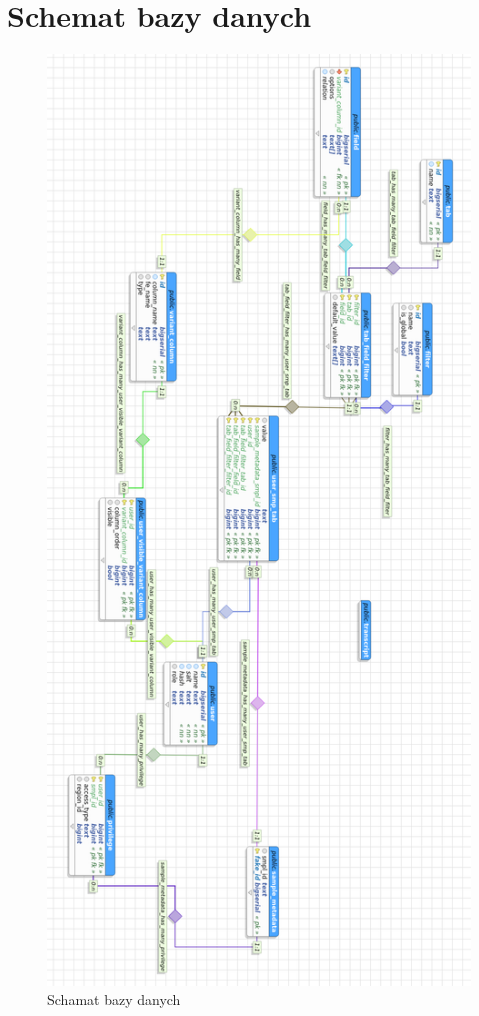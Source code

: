 \documentclass[a4paper,12pt,twoside]{article}
\begin{document}
\section{Schemat bazy danych}
\begin{figure}[h!]
\includegraphics[width=\textwidth, height=0.9\textheight]{obrazy/aplikacja/database2.png}
\caption{Schamat bazy danych}
\label{fig:bazadanych}
\end{figure}
\end{document}
